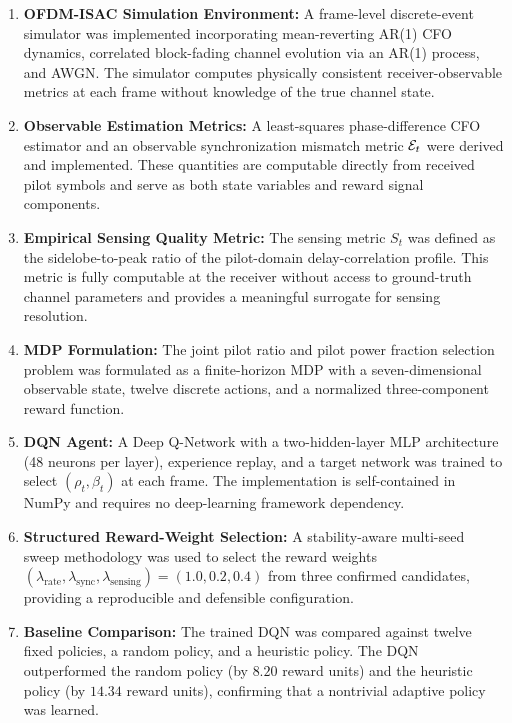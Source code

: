 \begin{enumerate}
    \item \textbf{OFDM-ISAC Simulation Environment:} A frame-level discrete-event simulator was implemented incorporating mean-reverting AR(1) CFO dynamics, correlated block-fading channel evolution via an AR(1) process, and AWGN. The simulator computes physically consistent receiver-observable metrics at each frame without knowledge of the true channel state.

    \item \textbf{Observable Estimation Metrics:} A least-squares phase-difference CFO estimator and an observable synchronization mismatch metric $\mathcal{E}_t$ were derived and implemented. These quantities are computable directly from received pilot symbols and serve as both state variables and reward signal components.

    \item \textbf{Empirical Sensing Quality Metric:} The sensing metric $S_t$ was defined as the sidelobe-to-peak ratio of the pilot-domain delay-correlation profile. This metric is fully computable at the receiver without access to ground-truth channel parameters and provides a meaningful surrogate for sensing resolution.

    \item \textbf{MDP Formulation:} The joint pilot ratio and pilot power fraction selection problem was formulated as a finite-horizon MDP with a seven-dimensional observable state, twelve discrete actions, and a normalized three-component reward function.

    \item \textbf{DQN Agent:} A Deep Q-Network with a two-hidden-layer MLP architecture (48 neurons per layer), experience replay, and a target network was trained to select $(\rho_t, \beta_t)$ at each frame. The implementation is self-contained in NumPy and requires no deep-learning framework dependency.

    \item \textbf{Structured Reward-Weight Selection:} A stability-aware multi-seed sweep methodology was used to select the reward weights $(\lambda_{\text{rate}}, \lambda_{\text{sync}}, \lambda_{\text{sensing}}) = (1.0, 0.2, 0.4)$ from three confirmed candidates, providing a reproducible and defensible configuration.

    \item \textbf{Baseline Comparison:} The trained DQN was compared against twelve fixed policies, a random policy, and a heuristic policy. The DQN outperformed the random policy (by $8.20$ reward units) and the heuristic policy (by $14.34$ reward units), confirming that a nontrivial adaptive policy was learned.
\end{enumerate}

